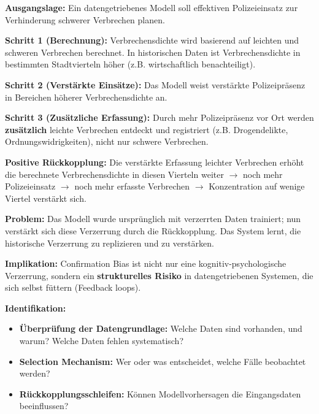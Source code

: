 
\textbf{Ausgangslage:} Ein datengetriebenes Modell soll effektiven Polizeieinsatz zur Verhinderung schwerer Verbrechen planen.

\textbf{Schritt 1 (Berechnung):} Verbrechensdichte wird basierend auf leichten und schweren Verbrechen berechnet. In historischen Daten ist Verbrechensdichte in bestimmten Stadtvierteln höher (z.B. wirtschaftlich benachteiligt).

\textbf{Schritt 2 (Verstärkte Einsätze):} Das Modell weist verstärkte Polizeipräsenz in Bereichen höherer Verbrechensdichte an.

\textbf{Schritt 3 (Zusätzliche Erfassung):} Durch mehr Polizeipräsenz vor Ort werden \textbf{zusätzlich} leichte Verbrechen entdeckt und registriert (z.B. Drogendelikte, Ordnungswidrigkeiten), nicht nur schwere Verbrechen.

\textbf{Positive Rückkopplung:} Die verstärkte Erfassung leichter Verbrechen erhöht die berechnete Verbrechensdichte in diesen Vierteln weiter $\to$ noch mehr Polizeieinsatz $\to$ noch mehr erfasste Verbrechen $\to$ Konzentration auf wenige Viertel verstärkt sich.

\textbf{Problem:} Das Modell wurde ursprünglich mit verzerrten Daten trainiert; nun verstärkt sich diese Verzerrung durch die Rückkopplung. Das System lernt, die historische Verzerrung zu replizieren und zu verstärken.

\textbf{Implikation:} Confirmation Bias ist nicht nur eine kognitiv-psychologische Verzerrung, sondern ein \textbf{strukturelles Risiko} in datengetriebenen Systemen, die sich selbst füttern (Feedback loops).


\textbf{Identifikation:}
\begin{itemize}[leftmargin=1.5em]
    \item \textbf{Überprüfung der Datengrundlage:} Welche Daten sind vorhanden, und warum? Welche Daten fehlen systematisch?
    \item \textbf{Selection Mechanism:} Wer oder was entscheidet, welche Fälle beobachtet werden?
    \item \textbf{Rückkopplungsschleifen:} Können Modellvorhersagen die Eingangsdaten beeinflussen?
\end{itemize}

